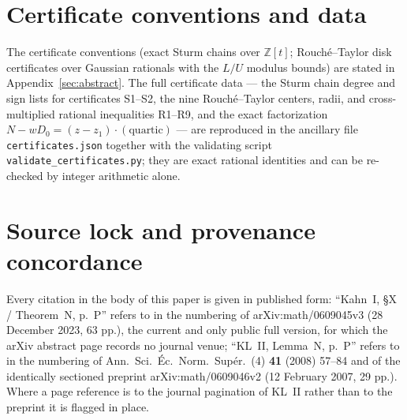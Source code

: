 \documentclass[11pt,reqno]{amsart}
\theoremstyle{definition}
\theoremstyle{remark}
\begin{document}
\section{Certificate conventions and data}
\label{app:certificates}
The certificate conventions (exact Sturm chains over $\mathbb Z[t]$;
Rouch\'e--Taylor disk certificates over Gaussian rationals with the
$L/U$ modulus bounds) are stated in Appendix~\ref{sec:abstract}.  The
full certificate data --- the Sturm chain degree and sign lists for
certificates S1--S2, the nine Rouch\'e--Taylor centers, radii, and
cross-multiplied rational inequalities R1--R9, and the exact
factorization $N-wD_{0}=(z-z_{1})\cdot(\text{quartic})$ --- are
reproduced in the ancillary file \texttt{certificates.json} together
with the validating script \texttt{validate\_certificates.py}; they
are exact rational identities and can be re-checked by
integer arithmetic alone.

\section{Source lock and provenance concordance}
\label{app:sourcelock}
Every citation in the body of this paper is given in published form:
``Kahn~I, \S X / Theorem~N, p.~P'' refers to \cite{KahnPrimitive06} in
the numbering of arXiv:math/0609045v3 (28 December 2023, 63 pp.), the
current and only public full version, for which the arXiv abstract page
records no journal venue; ``KL~II, Lemma~N, p.~P'' refers to
\cite{KLDecorations08} in the numbering of
Ann.\ Sci.\ \'Ec.\ Norm.\ Sup\'er.\ (4) \textbf{41} (2008) 57--84 and
of the identically sectioned preprint arXiv:math/0609046v2
(12 February 2007, 29 pp.).  Where a page reference is to the journal
pagination of KL~II rather than to the preprint it is flagged in place.
\end{document}
